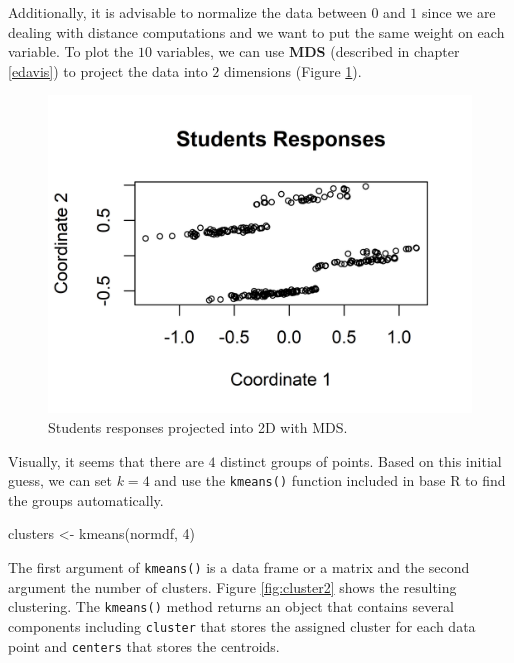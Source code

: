 \documentclass[
  11pt,
]{krantz}
\newenvironment{Shaded}{\begin{snugshade}}{\end{snugshade}}
\newcommand{\DecValTok}[1]{\textcolor[rgb]{0.06,0.06,0.06}{#1}}
\newcommand{\FunctionTok}[1]{\textcolor[rgb]{0,0,0}{#1}}
\newcommand{\NormalTok}[1]{#1}
\newcommand{\OtherTok}[1]{\textcolor[rgb]{0.37,0.37,0.37}{#1}}
\begin{document}
Additionally, it is advisable to normalize the data between \(0\) and \(1\) since we are dealing with distance computations and we want to put the same weight on each variable. To plot the \(10\) variables, we can use \textbf{MDS} (described in chapter \ref{edavis}) to project the data into \(2\) dimensions (Figure \ref{fig:cluster1}).

\begin{figure}

{\centering \includegraphics[width=0.9\linewidth]{images/cluster1} 

}

\caption{Students responses projected into 2D with MDS.}\label{fig:cluster1}
\end{figure}

Visually, it seems that there are \(4\) distinct groups of points. Based on this initial guess, we can set \(k=4\) and use the \texttt{kmeans()} function included in base R to find the groups automatically.

\begin{Shaded}
\begin{Highlighting}[]
\NormalTok{clusters }\OtherTok{\textless{}{-}} \FunctionTok{kmeans}\NormalTok{(normdf, }\DecValTok{4}\NormalTok{)}
\end{Highlighting}
\end{Shaded}

The first argument of \texttt{kmeans()} is a data frame or a matrix and the second argument the number of clusters. Figure \ref{fig:cluster2} shows the resulting clustering. The \texttt{kmeans()} method returns an object that contains several components including \texttt{cluster} that stores the assigned cluster for each data point and \texttt{centers} that stores the centroids.
\end{document}
